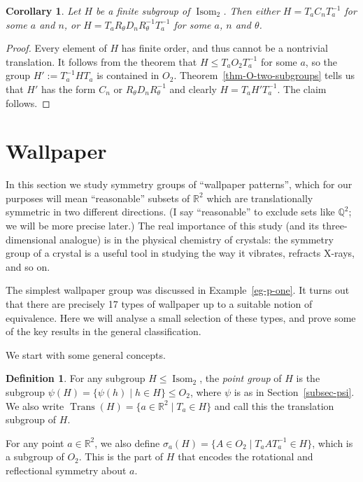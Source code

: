 \documentclass{amsart}
\DeclareMathOperator{\Trans}    {Trans}
\DeclareMathOperator{\Isom}     {Isom}
\newcommand{\Q}         {{\mathbb{Q}}}
\newcommand{\R}         {{\mathbb{R}}}
\newcommand{\st}        {\;|\;}
\newcommand{\sg}        {\sigma}
\renewcommand{\:}{\colon}
\newtheorem{corollary}[theorem]{Corollary}
\theoremstyle{definition}
\newtheorem{definition}[theorem]{Definition}
\begin{document}
\begin{corollary}\label{cor-plane-finite}
 Let $H$ be a finite subgroup of $\Isom_2$.  Then either
 $H=T_aC_nT_a^{-1}$ for some $a$ and $n$, or
 $H=T_aR_\theta D_n R_\theta^{-1}T_a^{-1}$ for some $a$, $n$ and $\theta$.
\end{corollary}
\begin{proof}
 Every element of $H$ has finite order, and thus cannot be a
 nontrivial translation.  It follows from the theorem that
 $H\leq T_a O_2 T_a^{-1}$ for some $a$, so the group
 $H':=T_a^{-1}HT_a$ is contained in $O_2$.
 Theorem~\ref{thm-O-two-subgroups} tells us that $H'$ has the form
 $C_n$ or $R_\theta D_n R_\theta^{-1}$ and clearly $H=T_aH'T_a^{-1}$.  The
 claim follows.
\end{proof}

\section{Wallpaper}
\label{sec-wallpaper}

In this section we study symmetry groups of ``wallpaper patterns'',
which for our purposes will mean ``reasonable'' subsets of $\R^2$
which are translationally symmetric in two different directions.  (I
say ``reasonable'' to exclude sets like $\Q^2$; we will be more
precise later.)  The real importance of this study (and its
three-dimensional analogue) is in the physical chemistry of crystals:
the symmetry group of a crystal is a useful tool in studying the way
it vibrates, refracts X-rays, and so on.

The simplest wallpaper group was discussed in Example~\ref{eg-p-one}.
It turns out that there are precisely 17 types of wallpaper up to a
suitable notion of equivalence.  Here we will analyse a small
selection of these types, and prove some of the key results in the
general classification.

We start with some general concepts.
\begin{definition}
 For any subgroup $H\leq \Isom_2$, the \emph{point group} of $H$ is the
 subgroup $\psi(H)=\{\psi(h)\st h\in H\}\leq O_2$, where $\psi$ is as
 in Section~\ref{subsec-psi}.  We also write
 $\Trans(H)=\{a\in\R^2\st T_a\in H\}$ and call this the translation
 subgroup of $H$.

 For any point $a\in\R^2$, we also define
 $\sg_a(H)=\{A\in O_2\st T_aAT_a^{-1}\in H\}$, which is a subgroup of
 $O_2$.  This is the part of $H$ that encodes the rotational and
 reflectional symmetry about $a$.
\end{definition}
\end{document}
